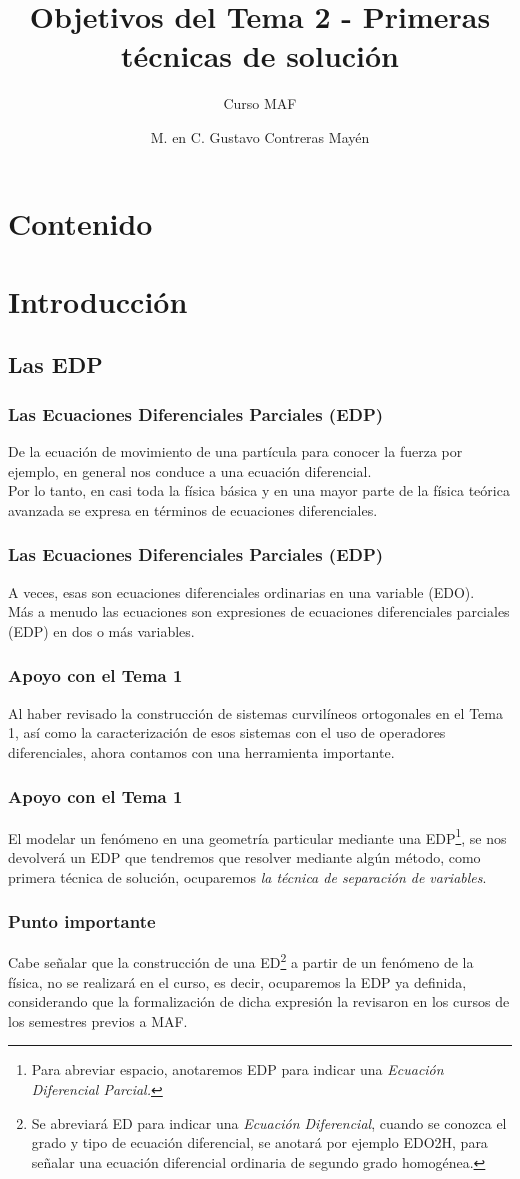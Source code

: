 \documentclass[12pt]{beamer}
\date{}
\title{\large{Objetivos del Tema 2 - Primeras técnicas de solución}}
\subtitle{Curso MAF}
\author{M. en C. Gustavo Contreras Mayén}
\begin{document}
\maketitle
\fontsize{14}{14}\selectfont
{}
\section*{Contenido}
\section{Introducción}
\subsection{Las EDP}
\begin{frame}
\frametitle{Las Ecuaciones Diferenciales Parciales (EDP)}
De la ecuación de movimiento de una partícula para conocer la fuerza por ejemplo, en general nos conduce a una ecuación diferencial.
\\
\bigskip
Por lo tanto, en casi toda la física  básica y en una mayor parte de la física teórica avanzada se expresa en términos de ecuaciones diferenciales.
\end{frame}
\begin{frame}
\frametitle{Las Ecuaciones Diferenciales Parciales (EDP)}
A veces, esas son ecuaciones diferenciales ordinarias en una variable (EDO).
\\
\bigskip
Más a menudo las ecuaciones son expresiones de ecuaciones diferenciales parciales (EDP) en dos o más variables.
\end{frame}
\begin{frame}
\frametitle{Apoyo con el Tema 1}
Al haber revisado la construcción de sistemas curvilíneos ortogonales en el Tema 1, así como la caracterización de esos sistemas con el uso de operadores diferenciales, ahora contamos con una herramienta importante.
\end{frame}
\begin{frame}
\frametitle{Apoyo con el Tema 1}
El modelar un fenómeno en una geometría particular mediante una EDP\footnote{Para abreviar espacio, anotaremos EDP para indicar una \emph{Ecuación Diferencial Parcial.}}, se nos devolverá un EDP que tendremos que resolver mediante algún método, como primera técnica de solución, ocuparemos \emph{la técnica de separación de variables}.
\end{frame}
\begin{frame}
\frametitle{Punto importante}
Cabe señalar que la construcción de una ED\footnote{Se abreviará ED para indicar una \emph{Ecuación Diferencial}, cuando se conozca el grado y tipo de ecuación diferencial, se anotará por ejemplo EDO2H, para señalar una ecuación diferencial ordinaria de segundo grado homogénea.} a partir de un fenómeno de la física, no se realizará en el curso, es decir, ocuparemos la EDP ya definida, considerando que la formalización de dicha expresión la revisaron en los cursos de los semestres previos a MAF.
\end{frame}
\end{document}
